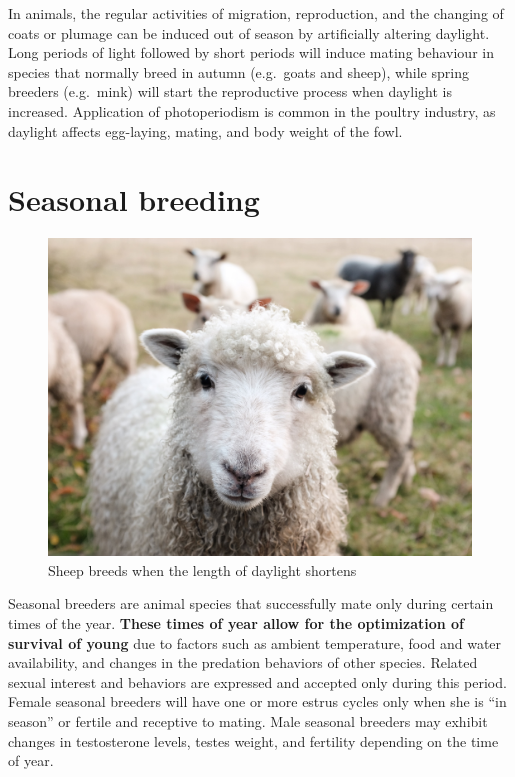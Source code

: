 \documentclass[]{book}
\begin{document}
In animals, the regular activities of migration, reproduction, and the
changing of coats or plumage can be induced out of season by
artificially altering daylight. Long periods of light followed by short
periods will induce mating behaviour in species that normally breed in
autumn (e.g.~goats and sheep), while spring breeders (e.g.~mink) will
start the reproductive process when daylight is increased. Application
of photoperiodism is common in the poultry industry, as daylight affects
egg-laying, mating, and body weight of the fowl.

\section{Seasonal breeding}\label{seasonal-breeding}

\begin{figure}

{\centering \includegraphics[width=1\linewidth]{figures/sheep} 

}

\caption{Sheep breeds when the length of daylight shortens}\label{fig:sheep}
\end{figure}

Seasonal breeders are animal species that successfully mate only during
certain times of the year. \textbf{These times of year allow for the
optimization of survival of young} due to factors such as ambient
temperature, food and water availability, and changes in the predation
behaviors of other species. Related sexual interest and behaviors are
expressed and accepted only during this period. Female seasonal breeders
will have one or more estrus cycles only when she is ``in season'' or
fertile and receptive to mating. Male seasonal breeders may exhibit
changes in testosterone levels, testes weight, and fertility depending
on the time of year.
\end{document}
